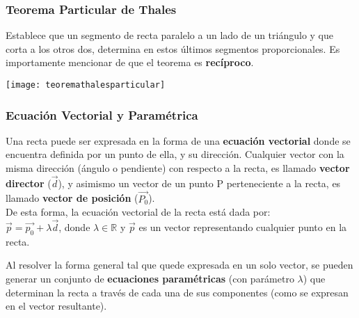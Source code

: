 \subsubsection{Teorema Particular de Thales}
Establece que un segmento de recta paralelo a un lado de un triángulo y que corta a los otros dos, determina en estos últimos segmentos proporcionales. Es importamente mencionar de que el teorema es \textbf{recíproco}.
\begin{center}
    \texttt{[image: teoremathalesparticular]}
\end{center}

\subsubsection{Ecuación Vectorial y Paramétrica}
Una recta puede ser expresada en la forma de una \textbf{ecuación vectorial} donde se encuentra definida por un punto de ella, y su dirección. Cualquier vector con la misma dirección (ángulo o pendiente) con respecto a la recta, es llamado \textbf{vector director} ($\vec{d}$), y asimismo un vector de un punto P perteneciente a la recta, es llamado \textbf{vector de posición} ($\vec{P_0}$).\\

De esta forma, la ecuación vectorial de la recta está dada por: \\
$\vec{p} = \vec{p_0} + \lambda\vec{d}$, donde $\lambda \in \mathbb{R}$ y $\vec{p}$ es un vector representando cualquier punto en la recta.



Al resolver la forma general tal que quede expresada en un solo vector, se pueden generar un conjunto de \textbf{ecuaciones paramétricas} (con parámetro $\lambda$) que determinan la recta a través de cada una de sus componentes (como se expresan en el vector resultante).\\

